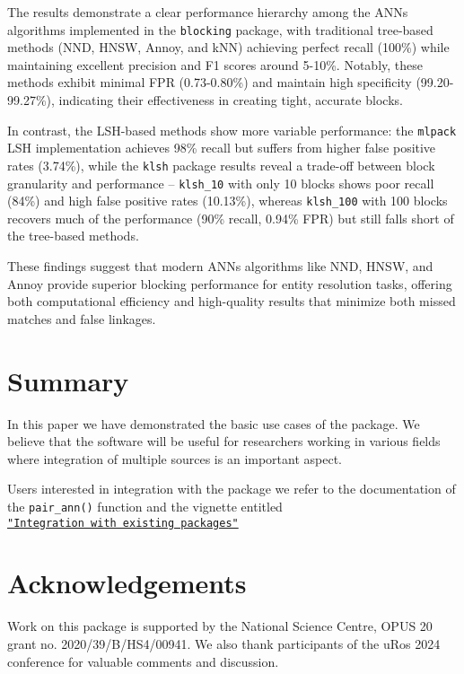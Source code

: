 The results demonstrate a clear performance hierarchy among the ANNs algorithms implemented in the \texttt{blocking} package, with traditional tree-based methods (NND, HNSW, Annoy, and kNN) achieving perfect recall (100\%) while maintaining excellent precision and F1 scores around 5-10\%. Notably, these methods exhibit minimal FPR (0.73-0.80\%) and maintain high specificity (99.20-99.27\%), indicating their effectiveness in creating tight, accurate blocks.

In contrast, the LSH-based methods show more variable performance: the \texttt{mlpack} LSH implementation achieves 98\% recall but suffers from higher false positive rates (3.74\%), while the \texttt{klsh} package results reveal a trade-off between block granularity and performance -- \texttt{klsh\_10} with only 10 blocks shows poor recall (84\%) and high false positive rates (10.13\%), whereas \texttt{klsh\_100} with 100 blocks recovers much of the performance (90\% recall, 0.94\% FPR) but still falls short of the tree-based methods.

These findings suggest that modern ANNs algorithms like NND, HNSW, and Annoy provide superior blocking performance for entity resolution tasks, offering both computational efficiency and high-quality results that minimize both missed matches and false linkages.

\section{Summary}\label{summary}

In this paper we have demonstrated the basic use cases of the
 package. We believe that the software will be useful
for researchers working in various fields where integration of multiple
sources is an important aspect.

Users interested in integration with the  package we
refer to the documentation of the \texttt{pair\_ann()} function and the vignette
entitled
\href{https://cran.r-project.org/web/packages/blocking/vignettes/v3-integration.html}{\texttt{"Integration\ with\ existing\ packages"}}

\section{Acknowledgements}\label{acknowledgements}

Work on this package is supported by the National Science Centre, OPUS
20 grant no. 2020/39/B/HS4/00941. We also thank participants of the uRos
2024 conference for valuable comments and discussion.

